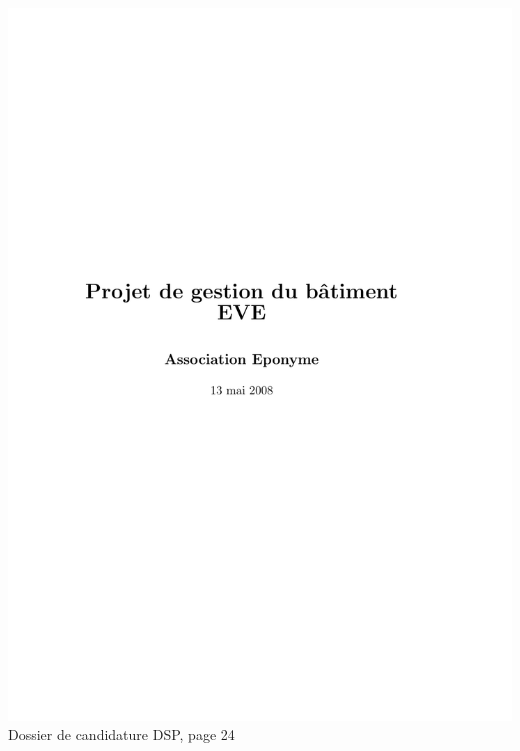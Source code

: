\includegraphics[scale=0.85,trim=20mm 20mm 20mm 20mm,clip,page=24]{annexes/candidature_dsp.pdf} \\
Dossier de candidature DSP, page 24
\newpage
